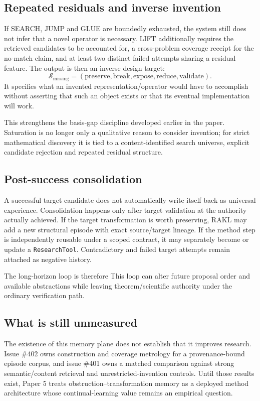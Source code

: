 \subsection{Repeated residuals and inverse invention}

If SEARCH, JUMP and GLUE are boundedly exhausted, the system still does not infer that a novel operator is necessary. LIFT additionally requires the retrieved candidates to be accounted for, a cross-problem coverage receipt for the no-match claim, and at least two distinct failed attempts sharing a residual feature. The output is then an inverse design target:
\[
\mathcal{S}_{\mathrm{missing}}
=
(\text{preserve},\text{break},\text{expose},\text{reduce},\text{validate}).
\]
It specifies what an invented representation/operator would have to accomplish without asserting that such an object exists or that its eventual implementation will work.

This strengthens the basis-gap discipline developed earlier in the paper. Saturation is no longer only a qualitative reason to consider invention; for strict mathematical discovery it is tied to a content-identified search universe, explicit candidate rejection and repeated residual structure.

\subsection{Post-success consolidation}

A successful target candidate does not automatically write itself back as universal experience. Consolidation happens only after target validation at the authority actually achieved. If the target transformation is worth preserving, RAKL may add a new structural episode with exact source/target lineage. If the method step is independently reusable under a scoped contract, it may separately become or update a \texttt{ResearchTool}. Contradictory and failed target attempts remain attached as negative history.

The long-horizon loop is therefore
This loop can alter future proposal order and available abstractions while leaving theorem/scientific authority under the ordinary verification path.

\subsection{What is still unmeasured}

The existence of this memory plane does not establish that it improves research. Issue \#402 owns construction and coverage metrology for a provenance-bound episode corpus, and issue \#401 owns a matched comparison against strong semantic/content retrieval and unrestricted-invention controls. Until those results exist, Paper 5 treats obstruction--transformation memory as a deployed method architecture whose continual-learning value remains an empirical question.
